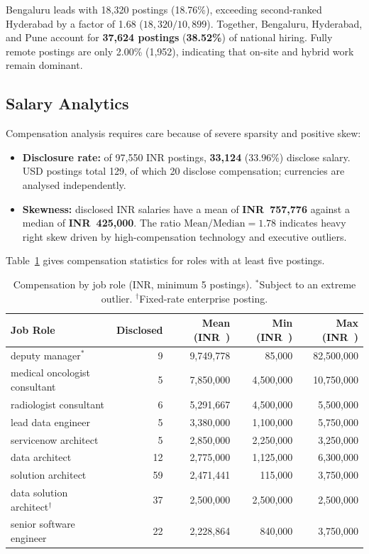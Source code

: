 \documentclass[10pt,a4paper]{article}
\newcommand{\rupee}{INR~}
\begin{document}
Bengaluru leads with 18,320 postings (18.76\%), exceeding second-ranked Hyderabad by a factor of 1.68 ($18{,}320 / 10{,}899$). Together, Bengaluru, Hyderabad, and Pune account for \textbf{37,624 postings} (\textbf{38.52\%}) of national hiring. Fully remote postings are only 2.00\% (1,952), indicating that on-site and hybrid work remain dominant.

\subsection{Salary Analytics}
Compensation analysis requires care because of severe sparsity and positive skew:
\begin{itemize}
  \item \textbf{Disclosure rate:} of 97,550 INR postings, \textbf{33,124} (33.96\%) disclose salary. USD postings total 129, of which 20 disclose compensation; currencies are analysed independently.
  \item \textbf{Skewness:} disclosed INR salaries have a mean of \textbf{\rupee 757,776} against a median of \textbf{\rupee 425,000}. The ratio $\text{Mean}/\text{Median} = 1.78$ indicates heavy right skew driven by high-compensation technology and executive outliers.
\end{itemize}

Table~\ref{tab:salary_roles} gives compensation statistics for roles with at least five postings.

\begin{table}[htbp]
\centering
\small
\begin{tabular}{@{}lrrrr@{}}
\toprule
\textbf{Job Role} & \textbf{Disclosed} & \textbf{Mean (\rupee)} & \textbf{Min (\rupee)} & \textbf{Max (\rupee)} \\
\midrule
deputy manager$^*$ & 9 & 9,749,778 & 85,000 & 82,500,000 \\
medical oncologist consultant & 5 & 7,850,000 & 4,500,000 & 10,750,000 \\
radiologist consultant & 6 & 5,291,667 & 4,500,000 & 5,500,000 \\
lead data engineer & 5 & 3,380,000 & 1,100,000 & 5,750,000 \\
servicenow architect & 5 & 2,850,000 & 2,250,000 & 3,250,000 \\
data architect & 12 & 2,775,000 & 1,125,000 & 6,300,000 \\
solution architect & 59 & 2,471,441 & 115,000 & 3,750,000 \\
data solution architect$^\dagger$ & 37 & 2,500,000 & 2,500,000 & 2,500,000 \\
senior software engineer & 22 & 2,228,864 & 840,000 & 3,750,000 \\
\bottomrule
\end{tabular}
\caption{Compensation by job role (INR, minimum 5 postings). $^*$Subject to an extreme outlier. $^\dagger$Fixed-rate enterprise posting.}
\label{tab:salary_roles}
\end{table}
\end{document}
